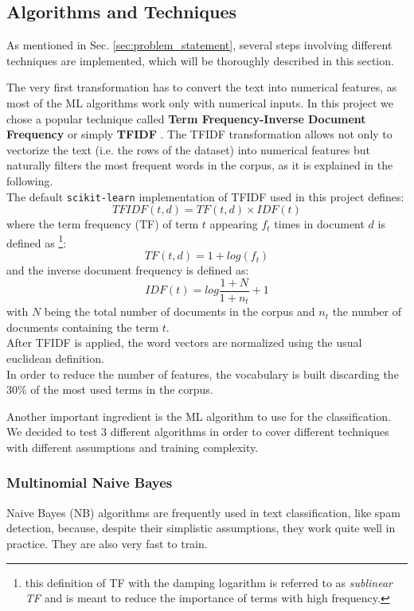 \documentclass[a4paper,12pt]{article} %
\begin{document}
\newpage
\subsection{Algorithms and Techniques}
\label{sec:algos}
As mentioned in Sec. \ref{sec:problem_statement}, several steps involving
different techniques are implemented, which will be thoroughly described in this section.

The very first transformation has to convert the text into numerical features,
as most of the ML algorithms work only with numerical inputs.
In this project we chose a popular technique called \textbf{Term Frequency-Inverse Document Frequency}
or simply \textbf{TFIDF} \cite{TFIDF}.
The TFIDF transformation allows not only to vectorize the text (i.e. the rows of the dataset)
into numerical features but naturally filters the most frequent words in the corpus,
as it is explained in the following. \\
The default \texttt{scikit-learn} implementation of TFIDF used in this project defines:
\begin{equation}
TFIDF (t, d) = TF(t, d) \times IDF (t)
\end{equation}
where the term frequency (TF) of term $t$ appearing $f_{t}$ times in document $d$ is defined as
\footnote{this definition of TF with the damping logarithm is referred to as \textit{sublinear TF} and
is meant to reduce the importance of terms with high frequency.}:
\begin{equation}
TF (t, d) = 1 + log(f_{t})
\end{equation}
and the inverse document frequency is defined as:
\begin{equation}
IDF (t) = log \frac{1+N}{1+n_{t}} + 1
\end{equation}
with $N$ being the total number of documents in the corpus and $n_{t}$ the number
of documents containing the term $t$.\\
After TFIDF is applied, the word vectors are normalized using the usual euclidean definition. \\
In order to reduce the number of features, the vocabulary is built discarding the
30\% of the most used terms in the corpus.

Another important ingredient is the ML algorithm to use for the classification.
We decided to test 3 different algorithms in order to cover different techniques with different assumptions
and training complexity.

\subsubsection*{Multinomial Naive Bayes}
Naive Bayes (NB) algorithms are frequently used in text classification,
like spam detection, because, despite their simplistic assumptions,
they work quite well in practice. They are also very fast to train.
\end{document}

